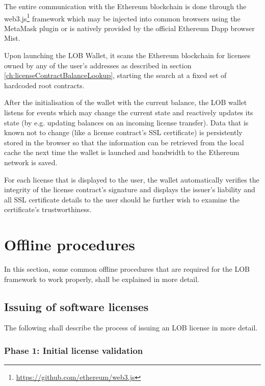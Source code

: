 \documentclass[a4paper]{article}
\begin{document}
The entire communication with the Ethereum blockchain is done through the web3.js\footnote{\url{https://github.com/ethereum/web3.js}} framework which may be injected into common browsers using the MetaMask plugin or is natively provided by the official Ethereum Dapp browser Mist.

Upon launching the LOB Wallet, it scans the Ethereum blockchain for licenses owned by any of the user's addresses as described in section \ref{ch:licenseContractBalanceLookup}, starting the search at a fixed set of hardcoded root contracts.

After the initialisation of the wallet with the current balance, the LOB wallet listens for events which may change the current state and reactively updates its state (by e.g. updating balances on an incoming license transfer). Data that is known not to change (like a license contract's SSL certificate) is persistently stored in the browser so that the information can be retrieved from the local cache the next time the wallet is launched and bandwidth to the Ethereum network is saved.

For each license that is displayed to the user, the wallet automatically verifies the integrity of the license contract's signature and displays the issuer's liability and all SSL certificate details to the user should he further wish to examine the certificate's trustworthiness.





\section{Offline procedures}
\label{ch:offlineProceedures}

In this section, some common offline procedures that are required for the LOB framework to work properly, shall be explained in more detail.





\subsection{Issuing of software licenses}

The following shall describe the process of issuing an LOB license in more detail. 

\subsubsection{Phase 1: Initial license validation}
\end{document}
